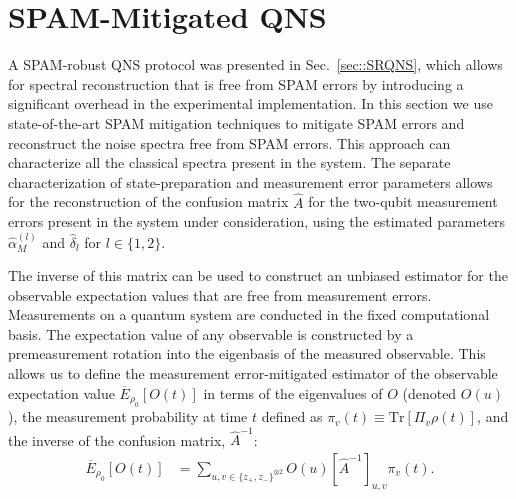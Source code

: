 \documentclass[%
 reprint,
superscriptaddress,
 amsmath,amssymb,
 aps,
pra,
floatfix,
]{revtex4-2}
\begin{document}
\section{SPAM-Mitigated QNS}
\label{sec::SMQNS}
A SPAM-robust QNS protocol was presented in Sec.\, \ref{sec::SRQNS}, which allows for spectral reconstruction that is free from SPAM errors by introducing a significant overhead in the experimental implementation. In this section we use state-of-the-art SPAM mitigation techniques to mitigate SPAM errors and reconstruct the noise spectra free from SPAM errors. This approach can characterize all the classical spectra present in the system. The separate characterization of state-preparation and measurement error parameters \cite{khan2025} allows for the reconstruction of the confusion matrix $\hat{A}$ for the two-qubit measurement errors present in the system under consideration, using the estimated parameters $\hat{\alpha}^{(l)}_M$ and $\hat{\delta}_{l}$ for $l \in \{1,2\}$.

The inverse of this matrix can be used to construct an unbiased estimator for the observable expectation values that are free from measurement errors. Measurements on a quantum system are conducted in the fixed computational basis. The expectation value of any observable is constructed by a premeasurement rotation into the eigenbasis of the measured observable. This allows us to define the measurement error-mitigated estimator of the observable expectation value $\overline{E}_{\rho_0}[O(t)]$ in terms of the eigenvalues of $O$ (denoted $O(u)$), the measurement probability at time $t$ defined as $\pi_v(t)\equiv \text{Tr}[\Pi_v \rho(t)]$, and the inverse of the confusion matrix, $\hat{A}^{-1}$:
\begin{align}
    \overline{E}_{\rho_0}[O(t)]&=\sum_{u,v\in\{z_+,z_-\}^{\otimes 2}}O(u)\left[\hat{A}^{-1}\right]_{u,v}\pi_v(t).
\end{align}
\end{document}
